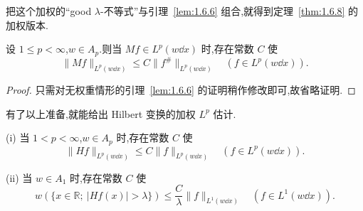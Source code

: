 把这个加权的``good $\lambda$-不等式''与引理~\ref{lem:1.6.6} 组合,就得到定理~\ref{thm:1.6.8} 的加权版本.

\begin{lemma}\label{lem:1.11.10}
设 $1 \leq p < \infty$,$w \in A_{p}$.则当 $Mf \in L^{p}(w\dd x)$ 时,存在常数 $C$ 使
\begin{equation*}
\| Mf \|_{L^{p}(w\dd x)} \leq C\| f^{\#} \|_{L^{p}(w\dd x)} \quad (f \in L^{p}(w\dd x)).
\end{equation*}
\end{lemma}

\begin{proof}
只需对无权重情形的引理~\ref{lem:1.6.6} 的证明稍作修改即可,故省略证明.
\end{proof}

有了以上准备,就能给出 Hilbert 变换的加权 $L^{p}$ 估计.

\begin{theorem}\label{thm:1.11.11}
(i) 当 $1 < p < \infty$,$w \in A_{p}$ 时,存在常数 $C$ 使
\begin{equation*}
\| Hf \|_{L^{p}(w\dd x)} \leq C\| f \|_{L^{p}(w\dd x)} \quad (f \in L^{p}(w\dd x)).
\end{equation*}

(ii) 当 $w \in A_{1}$ 时,存在常数 $C$ 使
\begin{equation*}
w(\{x \in \mathbb{R};\ |Hf(x)| > \lambda\}) \leq \frac{C}{\lambda}\| f \|_{L^{1}(w\dd x)} \quad (f \in L^{1}(w\dd x)).
\end{equation*}
\end{theorem}

